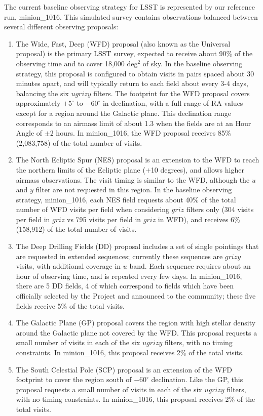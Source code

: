 The current baseline observing strategy for LSST is represented by our reference run, minion\_1016. This simulated survey
contains observations balanced between several different observing proposals:
\begin{enumerate}
\item The Wide, Fast, Deep (WFD) proposal (also known as the Universal proposal) is the primary LSST survey, expected to receive about 90\% of the observing time and to cover 18,000 deg$^2$ of sky. In the baseline observing strategy, this proposal is configured to obtain visits in pairs spaced about 30 minutes apart, and will typically return to each field about every 3-4 days, balancing the six $ugrizy$ filters. The footprint for the WFD proposal covers approximately $+5^\circ$ to $-60^\circ$ in declination, with a full range of RA values except for a region around the Galactic plane. This declination range corresponds to an airmass limit of about 1.3 when the fields are at an Hour Angle of $\pm$2 hours. In minion\_1016, the WFD proposal receives 85\% (2,083,758) of the total number of visits.
\item The North Ecliptic Spur (NES) proposal is an extension to the WFD to reach the northern limits of the Ecliptic plane ($+$10 degrees), and allows higher airmass observations. The visit timing is similar to the WFD, although the $u$ and $y$ filter are not requested in this region. In the baseline observing strategy, minion\_1016, each NES field requests about 40\% of the total number of WFD visits per field when considering $griz$ filters only (304 visits per field in $griz$ vs 795 visits per field in $griz$ in WFD), and receives 6\% (158,912) of the total number of visits.
\item The Deep Drilling Fields (DD) proposal includes a set of single pointings that are requested in extended sequences; currently these sequences are $grizy$ visits, with additional coverage in $u$ band. Each sequence requires about an hour of observing time, and is repeated every few days. In minion\_1016, there are 5 DD fields, 4 of which correspond to fields which have been officially selected
by the Project and announced to the community; these five fields receive 5\% of the total visits.
\item The Galactic Plane (GP) proposal covers the region with high stellar density around the Galactic plane not covered by the WFD. This proposal requests a small number of visits in each of the six $ugrizy$ filters, with no timing constraints. In minion\_1016, this proposal receives 2\% of the total visits.
\item The South Celestial Pole (SCP) proposal is an extension of the WFD footprint to cover the region south of $-60^\circ$ declination. Like the GP, this proposal requests a small number of visits in each of the six $ugrizy$ filters, with no timing constraints. In minion\_1016, this proposal receives 2\% of the total visits.
\end{enumerate}


